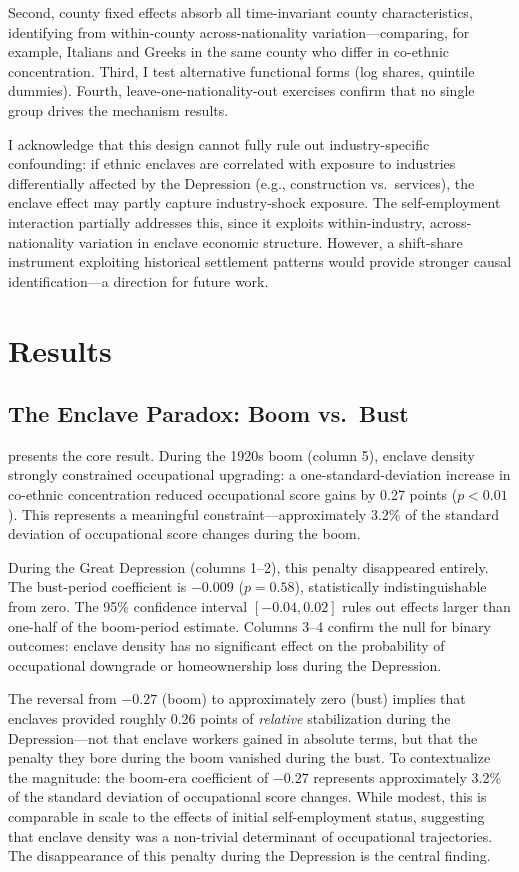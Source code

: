 \documentclass[12pt]{article}
\begin{document}
Second, county fixed effects absorb all time-invariant county characteristics, identifying from within-county across-nationality variation---comparing, for example, Italians and Greeks in the same county who differ in co-ethnic concentration. Third, I test alternative functional forms (log shares, quintile dummies). Fourth, leave-one-nationality-out exercises confirm that no single group drives the mechanism results.

I acknowledge that this design cannot fully rule out industry-specific confounding: if ethnic enclaves are correlated with exposure to industries differentially affected by the Depression (e.g., construction vs.\ services), the enclave effect may partly capture industry-shock exposure. The self-employment interaction partially addresses this, since it exploits within-industry, across-nationality variation in enclave economic structure. However, a shift-share instrument exploiting historical settlement patterns would provide stronger causal identification---a direction for future work.


\section{Results}

\subsection{The Enclave Paradox: Boom vs.\ Bust}

 presents the core result. During the 1920s boom (column 5), enclave density strongly constrained occupational upgrading: a one-standard-deviation increase in co-ethnic concentration reduced occupational score gains by 0.27 points ($p < 0.01$). This represents a meaningful constraint---approximately 3.2\% of the standard deviation of occupational score changes during the boom.

During the Great Depression (columns 1--2), this penalty disappeared entirely. The bust-period coefficient is $-0.009$ ($p = 0.58$), statistically indistinguishable from zero. The 95\% confidence interval $[-0.04, 0.02]$ rules out effects larger than one-half of the boom-period estimate. Columns 3--4 confirm the null for binary outcomes: enclave density has no significant effect on the probability of occupational downgrade or homeownership loss during the Depression.

The reversal from $-0.27$ (boom) to approximately zero (bust) implies that enclaves provided roughly 0.26 points of \textit{relative} stabilization during the Depression---not that enclave workers gained in absolute terms, but that the penalty they bore during the boom vanished during the bust. To contextualize the magnitude: the boom-era coefficient of $-0.27$ represents approximately 3.2\% of the standard deviation of occupational score changes. While modest, this is comparable in scale to the effects of initial self-employment status, suggesting that enclave density was a non-trivial determinant of occupational trajectories. The disappearance of this penalty during the Depression is the central finding.
\end{document}
